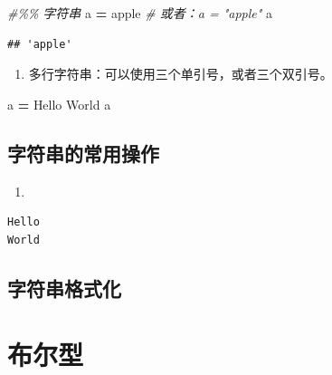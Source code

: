 \documentclass[
]{book}
\newenvironment{Shaded}{\begin{snugshade}}{\end{snugshade}}
\newcommand{\CommentTok}[1]{\textcolor[rgb]{0.56,0.35,0.01}{\textit{#1}}}
\newcommand{\NormalTok}[1]{#1}
\newcommand{\OperatorTok}[1]{\textcolor[rgb]{0.81,0.36,0.00}{\textbf{#1}}}
\newcommand{\StringTok}[1]{\textcolor[rgb]{0.31,0.60,0.02}{#1}}
\providecommand{\tightlist}{%
  \setlength{\itemsep}{0pt}\setlength{\parskip}{0pt}}
\begin{document}
\begin{Shaded}
\begin{Highlighting}[]
\CommentTok{\#\%\% 字符串}
\NormalTok{a }\OperatorTok{=} \StringTok{\textquotesingle{}apple\textquotesingle{}} \CommentTok{\# 或者：a = "apple"}
\NormalTok{a}
\end{Highlighting}
\end{Shaded}

\begin{verbatim}
## 'apple'
\end{verbatim}

\begin{enumerate}
\def\labelenumi{\arabic{enumi}.}
\setcounter{enumi}{1}
\tightlist
\item
  多行字符串：可以使用三个单引号，或者三个双引号。
\end{enumerate}

\begin{Shaded}
\begin{Highlighting}[]
\NormalTok{a }\OperatorTok{=} \StringTok{\textquotesingle{}\textquotesingle{}\textquotesingle{}Hello }
\StringTok{World}
\StringTok{\textquotesingle{}\textquotesingle{}\textquotesingle{}}
\NormalTok{a}
\end{Highlighting}
\end{Shaded}

\hypertarget{ux5b57ux7b26ux4e32ux7684ux5e38ux7528ux64cdux4f5c}{%
\subsection{字符串的常用操作}\label{ux5b57ux7b26ux4e32ux7684ux5e38ux7528ux64cdux4f5c}}

\begin{enumerate}
\def\labelenumi{\arabic{enumi}.}
\tightlist
\item
\end{enumerate}

\begin{verbatim}
Hello
World
\end{verbatim}

\hypertarget{ux5b57ux7b26ux4e32ux683cux5f0fux5316}{%
\subsection{字符串格式化}\label{ux5b57ux7b26ux4e32ux683cux5f0fux5316}}

\hypertarget{ux5e03ux5c14ux578b}{%
\section{布尔型}\label{ux5e03ux5c14ux578b}}
\end{document}
